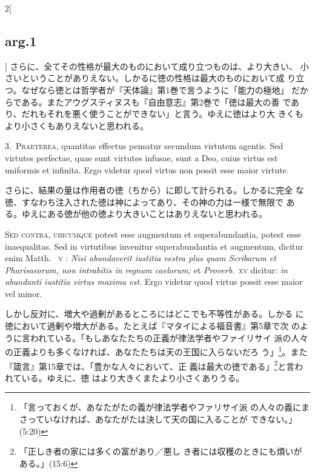 \documentclass[paper=a4paper,fontsize=10pt,jafontsize=9pt,titlepage]{jlreq}
\begin{document}
\begin{paracol}{2}[\subsection{arg.1}]
さらに、全てその性格が最大のものにおいて成り立つものは、より大きい、
 小さいということがありえない。しかるに徳の性格は最大のものにおいて成
 り立つ。なぜなら徳とは哲学者が『天体論』第1巻で言うように「能力の極地」
 だからである。またアウグスティヌスも『自由意志』第2巻で「徳は最大の善
 であり、だれもそれを悪く使うことができない」と言う。ゆえに徳はより大
 きくもより小さくもありえないと思われる。


3.~{\scshape Praeterea}, quantitas effectus pensatur secundum
 virtutem agentis. Sed virtutes perfectae, quae sunt virtutes infusae,
 sunt a Deo, cuius virtus est uniformis et infinita. Ergo videtur quod
 virtus non possit esse maior virtute.

\switchcolumn

さらに、結果の量は作用者の徳（ちから）に即して計られる。しかるに完全
 な徳、すなわち注入された徳は神によってあり、その神の力は一様で無限で
 ある。ゆえにある徳が他の徳より大きいことはありえないと思われる。

\switchcolumn*[\subsection{s.c.}]

{\scshape Sed contra, ubicumque} potest esse augmentum et
 superabundantia, potest esse inaequalitas. Sed in virtutibus
 invenitur superabundantia et augmentum, dicitur enim Matth.~{\scshape
 v} : {\itshape Nisi abundaverit iustitia vestra plus quam Scribarum
 et Pharisaeorum, non intrabitis in regnum caelorum;} et {\itshape
 Proverb}.~{\scshape xv} dicitur: {\itshape in abundanti iustitia
 virtus maxima est}. Ergo videtur quod virtus possit esse maior vel
 minor.

\switchcolumn

しかし反対に、増大や過剰があるところにはどこでも不等性がある。しかる
 に徳において過剰や増大がある。たとえば『マタイによる福音書』第5章で次
 のように言われている。「もしあなたたちの正義が律法学者やファイリサイ
 派の人々の正義よりも多くなければ、あなたたちは天の王国に入らないだろ
 う」\footnote{「言っておくが、あなたがたの義が律法学者やファリサイ派
 の人々の義にまさっていなければ、あなたがたは決して天の国に入ることが
 できない。」(5:20)}。また『箴言』第15章では、「豊かな人々において、正
 義は最大の徳である」\footnote{「正しき者の家には多くの富があり／悪し
 き者には収穫のときにも煩いがある。」(15:6)}と言われている。ゆえに、徳
 はより大きくまたより小さくありうる。


\end{paracol}
\end{document}
